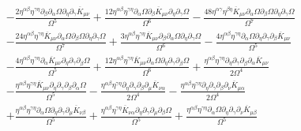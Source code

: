 \documentclass[10pt,letterpaper]{article}
\numberwithin{equation}{section}
\begin{document}
\begin{align}
&-  \frac{2 \eta^{\alpha \beta} \eta^{\gamma \eta} \partial_{\beta}\partial_{\alpha}\Omega \partial_{\eta}\partial_{\gamma}\overline{K}_{\mu \nu}}{\Omega^5} + \frac{12 \eta^{\alpha \beta} \eta^{\gamma \eta} \partial_{\alpha}\Omega \partial_{\beta}\overline{K}_{\mu \nu} \partial_{\eta}\partial_{\gamma}\Omega}{\Omega^6} -  \frac{48 \eta^{\alpha \gamma} \eta^{\beta \eta} \overline{K}_{\mu \nu} \partial_{\alpha}\Omega \partial_{\beta}\Omega \partial_{\eta}\partial_{\gamma}\Omega}{\Omega^7} \nonumber \\
&-  \frac{24 \eta^{\alpha \beta} \eta^{\gamma \eta} \overline{K}_{\mu \nu} \partial_{\alpha}\Omega \partial_{\beta}\Omega \partial_{\eta}\partial_{\gamma}\Omega}{\Omega^7} + \frac{3 \eta^{\alpha \beta} \eta^{\gamma \eta} \overline{K}_{\mu \nu} \partial_{\beta}\partial_{\alpha}\Omega \partial_{\eta}\partial_{\gamma}\Omega}{\Omega^6} -  \frac{4 \eta^{\alpha \beta} \eta^{\gamma \eta} \partial_{\alpha}\Omega \partial_{\eta}\partial_{\gamma}\partial_{\beta}\overline{K}_{\mu \nu}}{\Omega^5}\nonumber \\
& -  \frac{4 \eta^{\alpha \beta} \eta^{\gamma \eta} \partial_{\alpha}\overline{K}_{\mu \nu} \partial_{\eta}\partial_{\gamma}\partial_{\beta}\Omega}{\Omega^5} + \frac{12 \eta^{\alpha \beta} \eta^{\gamma \eta} \overline{K}_{\mu \nu} \partial_{\alpha}\Omega \partial_{\eta}\partial_{\gamma}\partial_{\beta}\Omega}{\Omega^6} + \frac{\eta^{\alpha \beta} \eta^{\gamma \eta} \partial_{\eta}\partial_{\gamma}\partial_{\beta}\partial_{\alpha}\overline{K}_{\mu \nu}}{2 \Omega^4}\nonumber \\
& -  \frac{\eta^{\alpha \beta} \eta^{\gamma \eta} \overline{K}_{\mu \nu} \partial_{\eta}\partial_{\gamma}\partial_{\beta}\partial_{\alpha}\Omega}{\Omega^5} -  \frac{\eta^{\alpha \beta} \eta^{\gamma \eta} \partial_{\eta}\partial_{\gamma}\partial_{\beta}\partial_{\mu}\overline{K}_{\nu \alpha}}{2 \Omega^4} -  \frac{\eta^{\alpha \beta} \eta^{\gamma \eta} \partial_{\eta}\partial_{\gamma}\partial_{\beta}\partial_{\nu}\overline{K}_{\mu \alpha}}{2 \Omega^4} \nonumber \\
&+ \frac{\eta^{\alpha \beta} \eta^{\gamma \eta} \partial_{\alpha}\Omega \partial_{\eta}\partial_{\gamma}\partial_{\mu}\overline{K}_{\nu \beta}}{\Omega^5} + \frac{\eta^{\alpha \beta} \eta^{\gamma \eta} \overline{K}_{\nu \alpha} \partial_{\eta}\partial_{\gamma}\partial_{\mu}\partial_{\beta}\Omega}{\Omega^5} + \frac{\eta^{\alpha \beta} \eta^{\gamma \eta} \partial_{\alpha}\Omega \partial_{\eta}\partial_{\gamma}\partial_{\nu}\overline{K}_{\mu \beta}}{\Omega^5} \nonumber \\

\end{align}
\end{document}
